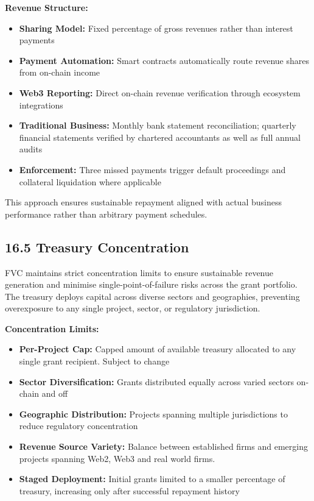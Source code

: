 \documentclass[
  paper=a4,
  ,captions=tableheading
]{scrartcl}
\providecommand{\tightlist}{%
  \setlength{\itemsep}{0pt}\setlength{\parskip}{0pt}}
\begin{document}
\textbf{Revenue Structure:}

\begin{itemize}
\tightlist
\item
  \textbf{Sharing Model:} Fixed percentage of gross revenues rather than
  interest payments
\item
  \textbf{Payment Automation:} Smart contracts automatically route
  revenue shares from on-chain income
\item
  \textbf{Web3 Reporting:} Direct on-chain revenue verification through
  ecosystem integrations
\item
  \textbf{Traditional Business:} Monthly bank statement reconciliation;
  quarterly financial statements verified by chartered accountants as
  well as full annual audits
\item
  \textbf{Enforcement:} Three missed payments trigger default
  proceedings and collateral liquidation where applicable
\end{itemize}

This approach ensures sustainable repayment aligned with actual business
performance rather than arbitrary payment schedules.

\subsection{16.5 Treasury Concentration}\label{treasury-concentration}

FVC maintains strict concentration limits to ensure sustainable revenue
generation and minimise single-point-of-failure risks across the grant
portfolio. The treasury deploys capital across diverse sectors and
geographies, preventing overexposure to any single project, sector, or
regulatory jurisdiction.

\textbf{Concentration Limits:}

\begin{itemize}
\tightlist
\item
  \textbf{Per-Project Cap:} Capped amount of available treasury allocated
  to any single grant recipient. Subject to change
\item
  \textbf{Sector Diversification:} Grants distributed equally across
  varied sectors on-chain and off
\item
\textbf{Geographic Distribution:} Projects spanning multiple
jurisdictions to reduce regulatory concentration
\item
  \textbf{Revenue Source Variety:} Balance between established firms
  and emerging projects spanning Web2, Web3 and real world firms.
\item
  \textbf{Staged Deployment:} Initial grants limited to a smaller
  percentage of treasury, increasing only after successful repayment
  history
\end{itemize}
\end{document}

